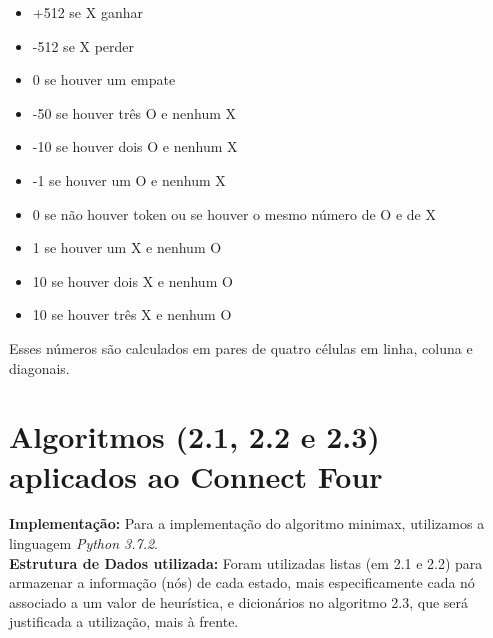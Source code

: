 \documentclass{article}
\begin{document}
\begin{itemize}
  \item[\textbullet]{+512 se X ganhar}
  \item[\textbullet]{-512 se X perder}
  \item[\textbullet]{0 se houver um empate}
  \item[\textbullet]{-50 se houver três O e nenhum X}
  \item[\textbullet]{-10 se houver dois O e nenhum X}
  \item[\textbullet]{-1 se houver um O e nenhum X}
  \item[\textbullet]{0 se não houver token ou se houver o mesmo número de O e de X}
  \item[\textbullet]{1 se houver um X e nenhum O}
  \item[\textbullet]{10 se houver dois X e nenhum O}
  \item[\textbullet]{10 se houver três X e nenhum O}
\end{itemize}

Esses números são calculados em pares de quatro células em linha, coluna e diagonais.


\section{Algoritmos (2.1, 2.2 e 2.3) aplicados ao Connect Four}
\textbf{Implementação:} Para a implementação do algoritmo minimax, utilizamos a linguagem \textit{Python 3.7.2}.\\[3mm]
\textbf{Estrutura de Dados utilizada:} Foram utilizadas listas (em 2.1 e 2.2) para armazenar a informação (nós) de cada estado, mais especificamente cada nó associado a um valor de heurística, e dicionários no algoritmo 2.3, que será justificada a utilização, mais à frente.
\end{document}
